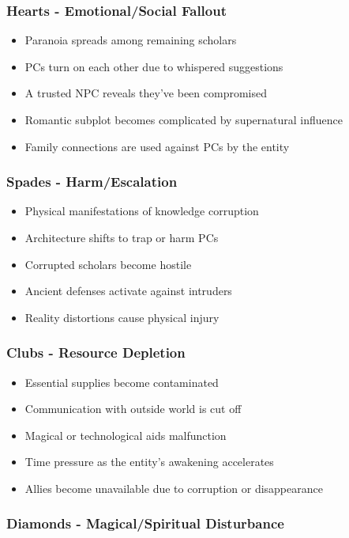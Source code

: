 \documentclass[11pt]{article}
\begin{document}
\subsubsection{Hearts - Emotional/Social Fallout}

\begin{itemize}
\item Paranoia spreads among remaining scholars
\item PCs turn on each other due to whispered suggestions
\item A trusted NPC reveals they've been compromised
\item Romantic subplot becomes complicated by supernatural influence
\item Family connections are used against PCs by the entity
\end{itemize}

\subsubsection{Spades - Harm/Escalation}

\begin{itemize}
\item Physical manifestations of knowledge corruption
\item Architecture shifts to trap or harm PCs
\item Corrupted scholars become hostile
\item Ancient defenses activate against intruders
\item Reality distortions cause physical injury
\end{itemize}

\subsubsection{Clubs - Resource Depletion}

\begin{itemize}
\item Essential supplies become contaminated
\item Communication with outside world is cut off
\item Magical or technological aids malfunction
\item Time pressure as the entity's awakening accelerates
\item Allies become unavailable due to corruption or disappearance
\end{itemize}

\subsubsection{Diamonds - Magical/Spiritual Disturbance}
\end{document}
